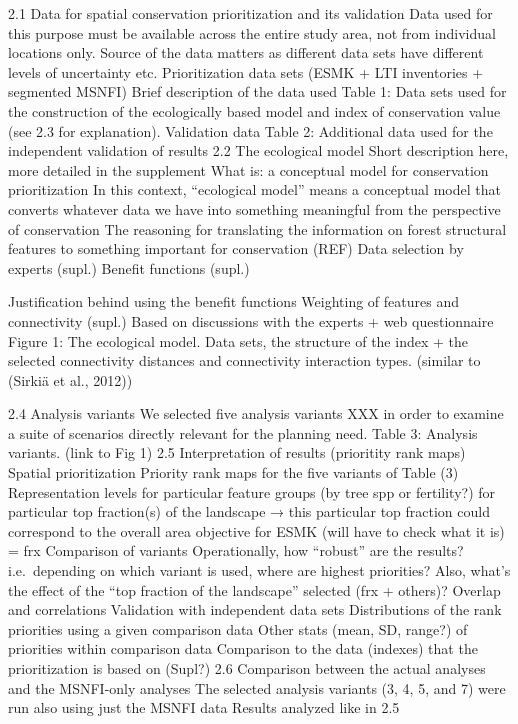 \documentclass[]{article}
\begin{document}
2.1 Data for spatial conservation prioritization and its validation Data
used for this purpose must be available across the entire study area,
not from individual locations only. Source of the data matters as
different data sets have different levels of uncertainty etc.
Prioritization data sets (ESMK + LTI inventories + segmented MSNFI)
Brief description of the data used Table 1: Data sets used for the
construction of the ecologically based model and index of conservation
value (see 2.3 for explanation). Validation data Table 2: Additional
data used for the independent validation of results 2.2 The ecological
model Short description here, more detailed in the supplement What is: a
conceptual model for conservation prioritization In this context,
``ecological model'' means a conceptual model that converts whatever
data we have into something meaningful from the perspective of
conservation The reasoning for translating the information on forest
structural features to something important for conservation (REF) Data
selection by experts (supl.) Benefit functions (supl.)

Justification behind using the benefit functions Weighting of features
and connectivity (supl.) Based on discussions with the experts + web
questionnaire Figure 1: The ecological model. Data sets, the structure
of the index + the selected connectivity distances and connectivity
interaction types. (similar to (Sirkiä et al., 2012)⁠)

2.4 Analysis variants We selected five analysis variants XXX in order to
examine a suite of scenarios directly relevant for the planning need.
Table 3: Analysis variants. (link to Fig 1) 2.5 Interpretation of
results (prioritity rank maps) Spatial prioritization Priority rank maps
for the five variants of Table (3) Representation levels for particular
feature groups (by tree spp or fertility?) for particular top
fraction(s) of the landscape → this particular top fraction could
correspond to the overall area objective for ESMK (will have to check
what it is) = frx Comparison of variants Operationally, how ``robust''
are the results? i.e.~depending on which variant is used, where are
highest priorities? Also, what's the effect of the ``top fraction of the
landscape'' selected (frx + others)? Overlap and correlations Validation
with independent data sets Distributions of the rank priorities using a
given comparison data Other stats (mean, SD, range?) of priorities
within comparison data Comparison to the data (indexes) that the
prioritization is based on (Supl?) 2.6 Comparison between the actual
analyses and the MSNFI-only analyses The selected analysis variants (3,
4, 5, and 7) were run also using just the MSNFI data Results analyzed
like in 2.5
\end{document}
